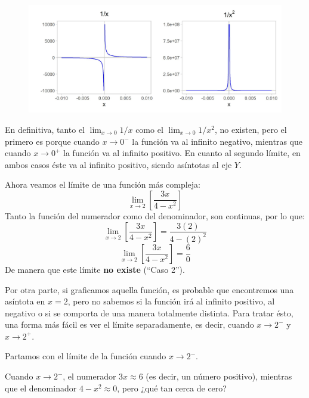 \documentclass[12pt]{article}
\begin{document}
\begin{figure}[hbt!]
\centering
\includegraphics[scale=0.7]{img/infinite_limit_plot_2.jpg}
\end{figure}

\newpage

En definitiva, tanto el $\lim_{x \to 0} 1/x$ como el $\lim_{x \to 0} 1/x^{2}$, no existen, pero el primero es porque cuando $x \to 0^{-}$ la función va al infinito negativo, mientras que cuando $x \to 0^{+}$ la función va al infinito positivo. En cuanto al segundo límite, en ambos casos éste va al infinito positivo, siendo asíntotas al eje $Y$.

Ahora veamos el límite de una función más compleja:
\[\lim_{x \to 2}\left[\frac{3x}{4 - x^{2}}\right]\]
Tanto la función del numerador como del denominador, son continuas, por lo que:
\[\lim_{x \to 2}\left[\frac{3x}{4 - x^{2}}\right] = \frac{3(2)}{4 - (2)^{2}}\]
\[\lim_{x \to 2}\left[\frac{3x}{4 - x^{2}}\right] = \frac{6}{0}\]
De manera que este límite \textbf{no existe} (``Caso 2'').

Por otra parte, si graficamos aquella función, es probable que encontremos una asíntota en $x = 2$, pero no sabemos si la función irá al infinito positivo, al negativo o si se comporta de una manera totalmente distinta. Para tratar ésto, una forma más fácil es ver el límite separadamente, es decir, cuando $x \to 2^{-}$ y $x \to 2^{+}$.

Partamos con el límite de la función cuando $x \to 2^{-}$.

Cuando $x \to 2^{-}$, el numerador $3x \approx 6$ (es decir, un número positivo), mientras que el denominador $4 - x^{2} \approx 0$, pero ¿qué tan cerca de cero?
\end{document}
